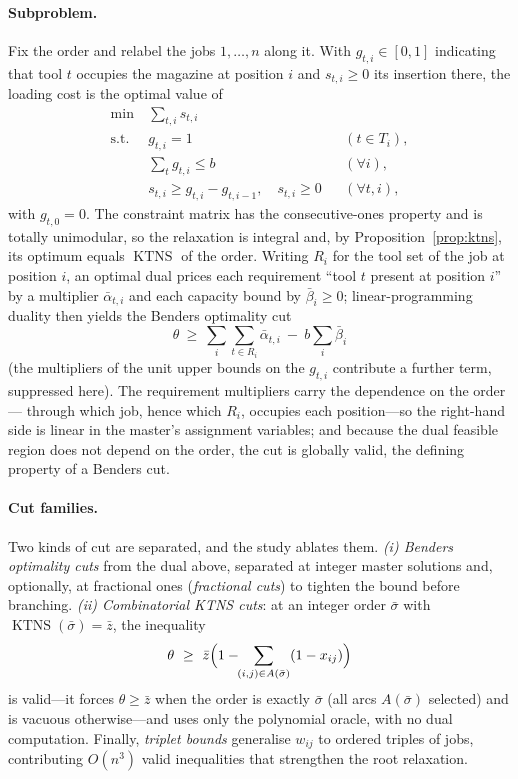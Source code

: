 \documentclass[11pt,a4paper]{article}
\theoremstyle{plain}
\theoremstyle{definition}
\theoremstyle{remark}
\DeclareMathOperator{\KTNS}{KTNS}
\begin{document}
\paragraph{Subproblem.}
Fix the order and relabel the jobs $1,\dots,n$ along it. With $g_{t,i}\in[0,1]$
indicating that tool $t$ occupies the magazine at position $i$ and $s_{t,i}\ge0$ its
insertion there, the loading cost is the optimal value of
\[
\begin{aligned}
  \min\ &\sum_{t,i}s_{t,i}\\
  \text{s.t.}\ & g_{t,i}=1 && (t\in T_i),\\
  & \textstyle\sum_{t}g_{t,i}\le b && (\forall i),\\
  & s_{t,i}\ge g_{t,i}-g_{t,i-1},\quad s_{t,i}\ge0 && (\forall t,i),
\end{aligned}
\]
with $g_{t,0}=0$. The constraint matrix has the consecutive-ones property and is
totally unimodular, so the relaxation is integral and, by
Proposition~\ref{prop:ktns}, its optimum equals $\KTNS$ of the order. Writing $R_i$
for the tool set of the job at position $i$, an optimal dual prices each requirement
``tool $t$ present at position $i$'' by a multiplier $\bar\alpha_{t,i}$ and each
capacity bound by $\bar\beta_i\ge0$; linear-programming duality then yields the
Benders optimality cut
\[
  \theta\ \ge\ \sum_i\sum_{t\in R_i}\bar\alpha_{t,i}\ -\ b\sum_i\bar\beta_i
\]
(the multipliers of the unit upper bounds on the $g_{t,i}$ contribute a further term,
suppressed here). The requirement multipliers carry the dependence on the order---%
through which job, hence which $R_i$, occupies each position---so the right-hand side
is linear in the master's assignment variables; and because the dual feasible region
does not depend on the order, the cut is globally valid, the defining property of a
Benders cut.

\paragraph{Cut families.}
Two kinds of cut are separated, and the study ablates them. \emph{(i) Benders
optimality cuts} from the dual above, separated at integer master solutions and,
optionally, at fractional ones (\emph{fractional cuts}) to tighten the bound before
branching. \emph{(ii) Combinatorial KTNS cuts}: at an integer order $\bar\sigma$
with $\KTNS(\bar\sigma)=\bar z$, the inequality
\[
  \theta\ \ge\ \bar z\Bigl(1-\!\!\sum_{(i,j)\in A(\bar\sigma)}(1-x_{ij})\Bigr)
\]
is valid---it forces $\theta\ge\bar z$ when the order is exactly $\bar\sigma$ (all
arcs $A(\bar\sigma)$ selected) and is vacuous otherwise---and uses only the
polynomial oracle, with no dual computation. Finally, \emph{triplet bounds}
generalise $w_{ij}$ to ordered triples of jobs, contributing $O(n^{3})$ valid
inequalities that strengthen the root relaxation.
\end{document}
